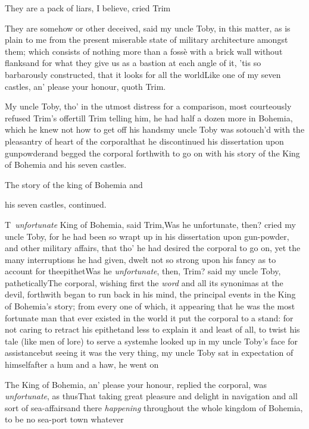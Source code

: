 \documentclass{article}
\begin{document}
\tsk They are a pack of liars, I believe, cried
Trim\tsh

\tsh They are somehow or other deceived, said my uncle
Toby, in this matter, as is plain to me from the present
miserable state of military architecture amongst them; which
consists of nothing more than a fossè with a brick wall without
flanks\tsk and for what they give us as a bastion at each angle
of it, ’tis so barbarously constructed, that it looks for all
the world\tsh \tsh Like one of my seven
castles, an’ please your honour, quoth Trim.

My uncle Toby, tho’ in the utmost distress for a
comparison, most courteously refused Trim’s
offer\tsk till Trim telling him, he had half a dozen more
in Bohemia, which he knew not how to get off his
hands\tsh my uncle Toby was so\pb touch’d with
the pleasantry of heart of the corporal\tsh that he
discontinued his dissertation upon gunpowder\tsh and
begged the corporal forthwith to go on with his story of the King
of Bohemia and his seven castles.

\bigskip
\centerline{The story of the king of Bohemia and}
\centerline{his seven castles, continued.}

\lettrine{T}{\,} \textit{unfortunate} King of
Bohemia, said Trim,\tsh Was he unfortunate,
then? cried my uncle Toby, for he had been so wrapt up in
his dissertation upon gun-powder, and other military affairs, that
tho’ he had desired the corporal to go on, yet the many
interruptions he had given, dwelt not so strong upon his fancy as
to account for the\pb epithet\tsh Was he \textit{unfortunate},
then, Trim? said my uncle Toby,
pathetically\break\tsh The corporal, wishing first the \textit{word} and
all its synonimas at the devil, forthwith began to run back in his
mind, the principal events in the King of Bohemia’s
story; from every one of which, it appearing that he was the most
fortunate man that ever existed in the world\tsh\break
it put the corporal to a stand: for not caring to retract his epithet\tsh and less
to explain it \tsh and least of all, to twist his tale (like men of lore) to serve a
system\tsh he looked up in my uncle Toby’s face for assistance\tsh but seeing it was
the very thing, my uncle Toby sat in expectation of himself\tsh after a hum and a
haw, he went on\tsh

\newpage
The King of Bohemia, an’ please your honour,
replied the corporal, was \textit{unfortunate}, as
thus\tsh That taking great pleasure and delight in
navigation and all sort of sea-affairs\tsh and there
\textit{happening} throughout the whole kingdom of Bohemia, to
be no sea-port town whatever\tsh
\end{document}
